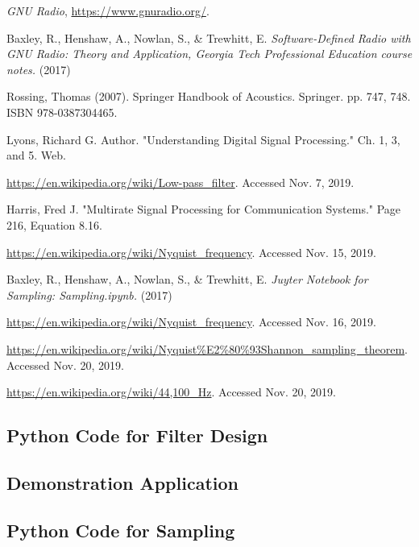 \begin{thebibliography}{1}

\emph{GNU Radio}, \url{https://www.gnuradio.org/}.

 Baxley, R., Henshaw, A., Nowlan, S., \&
Trewhitt, E. \emph{Software-Defined Radio with GNU Radio: Theory
and Application, Georgia Tech Professional Education course
notes.} (2017)

 Rossing, Thomas (2007). Springer Handbook of
Acoustics. Springer. pp. 747, 748. ISBN 978-0387304465.

 Lyons, Richard G. Author. "Understanding
Digital Signal Processing." Ch. 1, 3, and 5. Web.

\url{https://en.wikipedia.org/wiki/Low-pass_filter}. Accessed
Nov. 7, 2019.

 Harris, Fred J. "Multirate Signal Processing
for Communication Systems." Page 216, Equation 8.16.

\url{https://en.wikipedia.org/wiki/Nyquist_frequency}. Accessed
Nov. 15, 2019.

 Baxley, R., Henshaw, A., Nowlan, S.,
\& Trewhitt, E. \emph{Juyter Notebook for Sampling:
Sampling.ipynb.} (2017)

\url{https://en.wikipedia.org/wiki/Nyquist_frequency}. Accessed
Nov. 16, 2019.

\url{https://en.wikipedia.org/wiki/Nyquist\%E2\%80\%93Shannon_sampling_theorem}.
Accessed Nov. 20, 2019.

 \url{https://en.wikipedia.org/wiki/44,100_Hz}.
Accessed Nov. 20, 2019.

\end{thebibliography}

\newpage

\onecolumn 
\appendix 

\subsection{Python Code for Filter Design\cite{notes:class}}


\newpage
\subsection{Demonstration Application}


\newpage
\subsection{Python Code for Sampling\cite{notes:class}}





